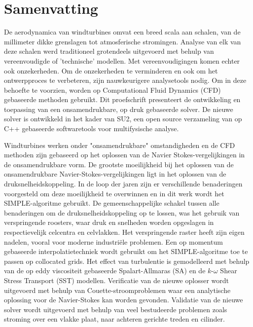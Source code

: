 \chapter*{Samenvatting}

{
De aerodynamica van windturbines omvat een breed scala aan schalen, van de millimeter dikke grenslagen tot atmosferische stromingen. Analyse van elk van deze schalen werd traditioneel grotendeels uitgevoerd met behulp van vereenvoudigde of 'technische' modellen. Met vereenvoudigingen komen echter ook onzekerheden. Om de onzekerheden te verminderen en ook om het ontwerpproces te verbeteren, zijn nauwkeurigere analysetools nodig. Om in deze behoefte te voorzien, worden op Computational Fluid Dynamics (CFD) gebaseerde methoden gebruikt. Dit proefschrift presenteert de ontwikkeling en toepassing van een onsamendrukbare, op druk gebaseerde solver. De nieuwe solver is ontwikkeld in het kader van SU2, een open source verzameling van op C++ gebaseerde softwaretools voor multifysische analyse.

Windturbines werken onder "onsamendrukbare" omstandigheden en de CFD methoden zijn gebaseerd op het oplossen van de Navier Stokes-vergelijkingen in de onsamendrukbare vorm. De grootste moeilijkheid bij het oplossen van de onsamendrukbare Navier-Stokes-vergelijkingen ligt in het oplossen van de druksnelheidskoppeling. In de loop der jaren zijn er verschillende benaderingen voorgesteld om deze moeilijkheid te overwinnen en in dit werk wordt het SIMPLE-algoritme gebruikt. De gemeenschappelijke schakel tussen alle benaderingen om de druksnelheidskoppeling op te lossen, was het gebruik van verspringende roosters, waar druk en snelheden worden opgeslagen in respectievelijk celcentra en celvlakken. Het verspringende raster heeft zijn eigen nadelen, vooral voor moderne industriële problemen. Een op momentum gebaseerde interpolatietechniek wordt gebruikt om het SIMPLE-algoritme toe te passen op collocated grids. Het effect van turbulentie is gemodelleerd met behulp van de op eddy viscositeit gebaseerde Spalart-Allmaras (SA) en de $k$-$\omega$ Shear Stress Transport (SST) modellen. Verificatie van de nieuwe oplosser wordt uitgevoerd met behulp van Couette-stroomproblemen waar een analytische oplossing voor de Navier-Stokes kan worden gevonden. Validatie van de nieuwe solver wordt uitgevoerd met behulp van veel bestudeerde problemen zoals stroming over een vlakke plaat, naar achteren gerichte treden en cilinder.

}
